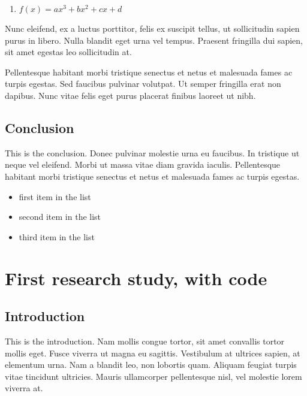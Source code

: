 \documentclass[12pt,turkish,a4paperpaper,]{report}
\providecommand{\tightlist}{%
  \setlength{\itemsep}{0pt}\setlength{\parskip}{0pt}}
\begin{document}
\begin{enumerate}
\def\labelenumi{(\arabic{enumi})}
\tightlist
\item
  \(f(x) = ax^3 + bx^2 + cx + d\)
\end{enumerate}

Nunc eleifend, ex a luctus porttitor, felis ex suscipit tellus, ut
sollicitudin sapien purus in libero. Nulla blandit eget urna vel tempus.
Praesent fringilla dui sapien, sit amet egestas leo sollicitudin at.

Pellentesque habitant morbi tristique senectus et netus et malesuada
fames ac turpis egestas. Sed faucibus pulvinar volutpat. Ut semper
fringilla erat non dapibus. Nunc vitae felis eget purus placerat finibus
laoreet ut nibh.

\hypertarget{conclusion}{%
\section{Conclusion}\label{conclusion}}

This is the conclusion. Donec pulvinar molestie urna eu faucibus. In
tristique ut neque vel eleifend. Morbi ut massa vitae diam gravida
iaculis. Pellentesque habitant morbi tristique senectus et netus et
malesuada fames ac turpis egestas.

\begin{itemize}
\tightlist
\item
  first item in the list
\item
  second item in the list
\item
  third item in the list
\end{itemize}

\hypertarget{first-research-study-with-code}{%
\chapter{First research study, with
code}\label{first-research-study-with-code}}

\thispagestyle{empty}

\hypertarget{introduction-1}{%
\section{Introduction}\label{introduction-1}}

This is the introduction. Nam mollis congue tortor, sit amet convallis
tortor mollis eget. Fusce viverra ut magna eu sagittis. Vestibulum at
ultrices sapien, at elementum urna. Nam a blandit leo, non lobortis
quam. Aliquam feugiat turpis vitae tincidunt ultricies. Mauris
ullamcorper pellentesque nisl, vel molestie lorem viverra at.
\end{document}
